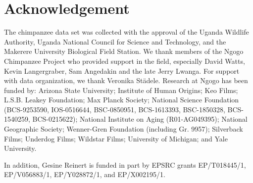 \documentclass{article}
\theoremstyle{plain}
\theoremstyle{definition}
\theoremstyle{remark}
\begin{document}
\section*{Acknowledgement}
The chimpanzee data set was collected with the approval of the Uganda Wildlife Authority, Uganda National Council for Science and Technology, and the Makerere University Biological Field Station. We thank members of the Ngogo Chimpanzee Project who provided support in the field, especially David Watts, Kevin Langergraber, Sam Angedakin and the late Jerry Lwanga. For support with data organization, we thank Veronika Städele. Research at Ngogo has been funded by: Arizona State University; Institute of Human Origins; Keo Films; L.S.B. Leakey Foundation; Max Planck Society; National Science Foundation (BCS-9253590, IOS-0516644, BSC-0850951, BCS-1613393, BSC-1850328, BCS- 1540259, BCS-0215622); National Institute on Aging (R01-AG049395); National Geographic Society; Wenner-Gren Foundation (including Gr. 9957); Silverback Films; Underdog Films; Wildstar Films; University of Michigan; and Yale University.

In addition, Gesine Reinert is funded in part by EPSRC grants EP/T018445/1, EP/V056883/1, EP/Y028872/1,  and EP/X002195/1.
\newpage




\newpage
\appendix
\onecolumn
\end{document}
